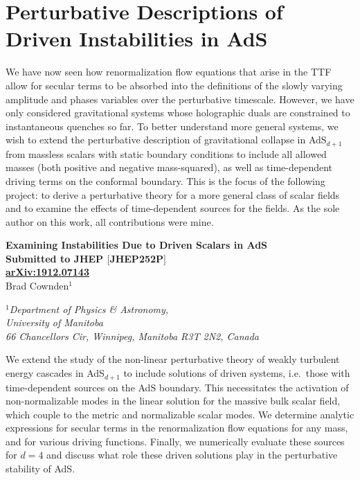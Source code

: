 \documentclass[../PhD.tex]{subfiles}
\begin{document}

\chapter{Perturbative Descriptions of Driven Instabilities in AdS}
\label{ch: driven}

We have now seen how renormalization flow equations that arise in the TTF allow for secular terms to be absorbed into the definitions of the slowly varying amplitude and phases variables over the perturbative timescale. However, we have only considered gravitational systems whose holographic duals are constrained to instantaneous quenches so far. To better understand more general systems, we wish to extend the perturbative description of gravitational collapse in AdS$_{d+1}$ from massless scalars with static boundary conditions to include all allowed masses (both positive and negative mass-squared), as well as time-dependent driving terms on the conformal boundary. This is the focus of the following project: to derive a perturbative theory for a more general class of scalar fields and to examine the effects of time-dependent sources for the fields. As the sole author on this work, all contributions were mine.

\newpage


\begin{center}
{\bf{\Large Examining Instabilities Due to Driven Scalars in AdS}} \\
\bigskip
{\bf Submitted to JHEP {\rm$\big[$JHEP\!\textunderscore 252P\!$\big]$} \\ \href{http://arxiv.org/abs/1912.07143}{arXiv:1912.07143}} \\
\bigskip
\bigskip
Brad Cownden$^1$\\
\bigskip

$^1${\it Department of Physics \& Astronomy,\\ University of Manitoba\\
66 Chancellors Cir, Winnipeg, Manitoba R3T 2N2, Canada}

\end{center}

\bigskip

We extend the study of the non-linear perturbative theory of weakly turbulent energy cascades in AdS$_{d+1}$ to include solutions of driven systems, i.e.~those with time-dependent sources on the AdS boundary. This necessitates the activation of non-normalizable modes in the linear solution for the massive bulk scalar field, which couple to the metric and normalizable scalar modes. We determine analytic expressions for secular terms in the renormalization flow equations for any mass, and for various driving functions. Finally, we numerically evaluate these sources for $d=4$ and discuss what role these driven solutions play in the perturbative stability of AdS.
\end{document}
